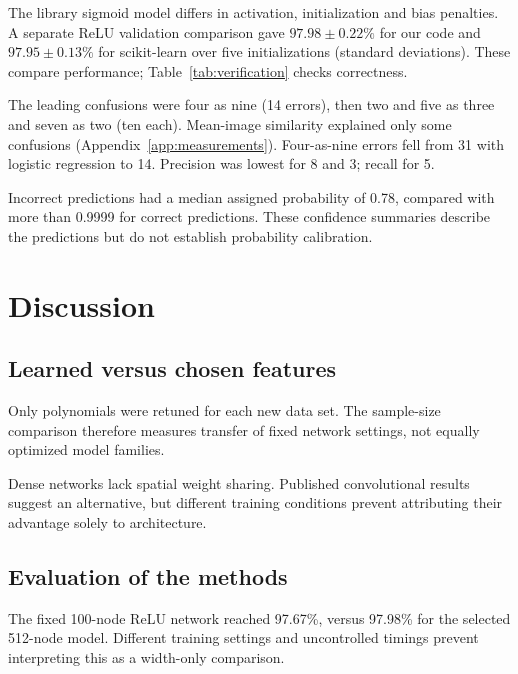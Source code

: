 \documentclass[aps,prb,reprint,superscriptaddress,nofootinbib,longbibliography,floatfix]{revtex4-2}
\begin{document}
The library sigmoid model differs in activation, initialization and bias penalties. A separate ReLU validation comparison gave $97.98\pm0.22\%$ for our code and $97.95\pm0.13\%$ for scikit-learn over five initializations (standard deviations). These compare performance; Table~\ref{tab:verification} checks correctness.

The leading confusions were four as nine (14 errors), then two and five as three and seven as two (ten each). Mean-image similarity explained only some confusions (Appendix~\ref{app:measurements}). Four-as-nine errors fell from 31 with logistic regression to 14. Precision was lowest for 8 and 3; recall for 5.

Incorrect predictions had a median assigned probability of 0.78, compared with more than 0.9999 for correct predictions. These confidence summaries describe the predictions but do not establish probability calibration.

\section{Discussion}\label{sec:discussion}

\subsection{Learned versus chosen features}\label{sec:disc_features}

Only polynomials were retuned for each new data set. The sample-size comparison therefore measures transfer of fixed network settings, not equally optimized model families.

Dense networks lack spatial weight sharing. Published convolutional results \cite{LeCun1998} suggest an alternative, but different training conditions prevent attributing their advantage solely to architecture.

\subsection{Evaluation of the methods}\label{sec:evaluation}

The fixed 100-node ReLU network reached 97.67\%, versus 97.98\% for the selected 512-node model. Different training settings and uncontrolled timings prevent interpreting this as a width-only comparison.
\end{document}
